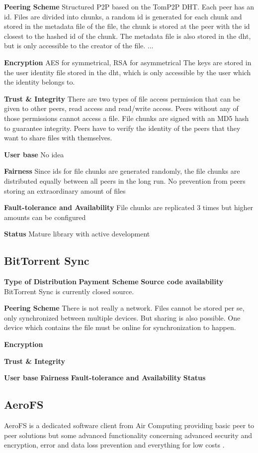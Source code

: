 \textbf{Peering Scheme}
Structured P2P based on the TomP2P DHT. Each peer has an id. Files are divided into chunks, a random id is generated for each chunk and stored in the metadata file of the file, the chunk is stored at the peer with the id closest to the hashed id of the chunk. The metadata file is also stored in the dht, but is only accessible to the creator of the file. ...

\textbf{Encryption}
AES for symmetrical, RSA for asymmetrical
The keys are stored in the user identity file stored in the dht, which is only accessible by the user which the identity belongs to.

\textbf{Trust \& Integrity}
There are two types of file access permission that can be given to other peers, read access and read/write access. Peers without any of those permissions cannot access a file. File chunks are signed with an MD5 hash to guarantee integrity. Peers have to verify the identity of the peers that they want to share files with themselves.

\textbf{User base}
No idea

\textbf{Fairness}
Since ids for file chunks are generated randomly, the file chunks are distributed equally between all peers in the long run. No prevention from peers storing an extraordinary amount of files

\textbf{Fault-tolerance and Availability}
File chunks are replicated 3 times but higher amounts can be configured

\textbf{Status}
Mature library with active development

\subsection{BitTorrent Sync} %

\textbf{Type of Distribution}
\textbf{Payment Scheme}
\textbf{Source code availability}
BitTorrent Sync is currently closed source.

\textbf{Peering Scheme}
There is not really a network. Files cannot be stored per se, only synchronized between multiple devices. But sharing is also possible. One device which contains the file must be online for synchronization to happen.

\textbf{Encryption}

\textbf{Trust \& Integrity}

\textbf{User base}
\textbf{Fairness}
\textbf{Fault-tolerance and Availability}
\textbf{Status}

\subsection{AeroFS} %
AeroFS is a dedicated software client from Air Computing providing basic peer to peer solutions but some advanced functionality concerning advanced security and encryption, error and data loss prevention and everything for low costs \cite{aerofs}.

